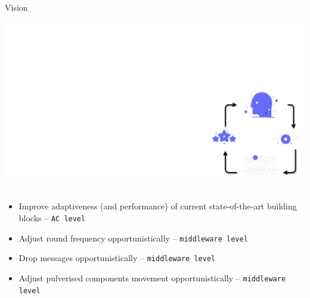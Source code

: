 \begin{frame}{\playfairblack Vision}
  \begin{backgroundblock} 
    \includegraphics[width=\paperwidth]{img/rl-background.pdf} 
  \end{backgroundblock}
  \begin{columns}[onlytextwidth, t]
    \begin{column}{0.7\textwidth}
      \begin{card}
        \begin{itemize}
          \item[\highlightAlt{\faStar}] Improve adaptiveness (and performance) of current state-of-the-art building blocks -- \texttt{AC level}
          \item[\highlightAlt{\faStar}] Adjust round frequency opportunistically -- \texttt{middleware level}
          \item[\highlightAlt{\faStar}] Drop messages opportunistically -- \texttt{middleware level}
          \item[\highlightAlt{\faStar}] Adjust pulverised components movement opportunistically -- \texttt{middleware level}
        \end{itemize}
      \end{card}
    \end{column}
  \end{columns}
\end{frame}